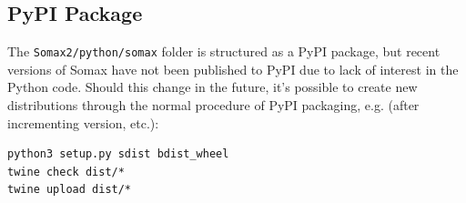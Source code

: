 
\subsection{PyPI Package}\label{ssec:2-pypi-package}
The \texttt{Somax2/python/somax} folder is structured as a PyPI package, but recent versions of Somax have not been published to PyPI due to lack of interest in the Python code. Should this change in the future, it's possible to create new distributions through the normal procedure of PyPI packaging, e.g. (after incrementing version, etc.):
\begin{lstlisting}
python3 setup.py sdist bdist_wheel
twine check dist/*
twine upload dist/*
\end{lstlisting}



